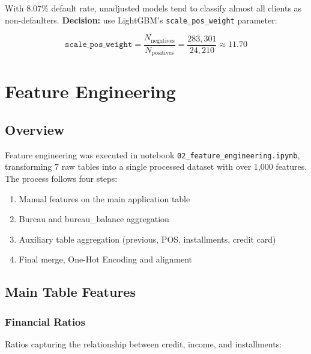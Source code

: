 \documentclass[12pt, a4paper]{article}
\begin{document}
With 8.07\% default rate, unadjusted models tend to classify almost all clients as
non-defaulters. \textbf{Decision:} use LightGBM's \texttt{scale\_pos\_weight} parameter:

\begin{equation}
    \texttt{scale\_pos\_weight} = \frac{N_{\text{negatives}}}{N_{\text{positives}}}
    = \frac{283{,}301}{24{,}210} \approx 11.70
\end{equation}

\section{Feature Engineering}

\subsection{Overview}

Feature engineering was executed in notebook \texttt{02\_feature\_engineering.ipynb},
transforming 7 raw tables into a single processed dataset with over 1,000 features.
The process follows four steps:

\begin{enumerate}
    \item Manual features on the main application table
    \item Bureau and bureau\_balance aggregation
    \item Auxiliary table aggregation (previous, POS, installments, credit card)
    \item Final merge, One-Hot Encoding and alignment
\end{enumerate}

\subsection{Main Table Features}

\subsubsection{Financial Ratios}

Ratios capturing the relationship between credit, income, and installments:
\end{document}
